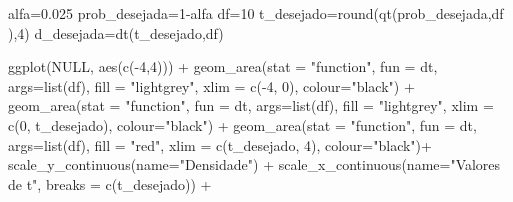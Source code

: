 \documentclass[
]{book}
\newenvironment{Shaded}{\begin{snugshade}}{\end{snugshade}}
\newcommand{\AttributeTok}[1]{\textcolor[rgb]{0.77,0.63,0.00}{#1}}
\newcommand{\ConstantTok}[1]{\textcolor[rgb]{0.00,0.00,0.00}{#1}}
\newcommand{\DecValTok}[1]{\textcolor[rgb]{0.00,0.00,0.81}{#1}}
\newcommand{\FloatTok}[1]{\textcolor[rgb]{0.00,0.00,0.81}{#1}}
\newcommand{\FunctionTok}[1]{\textcolor[rgb]{0.00,0.00,0.00}{#1}}
\newcommand{\NormalTok}[1]{#1}
\newcommand{\OtherTok}[1]{\textcolor[rgb]{0.56,0.35,0.01}{#1}}
\newcommand{\SpecialCharTok}[1]{\textcolor[rgb]{0.00,0.00,0.00}{#1}}
\newcommand{\StringTok}[1]{\textcolor[rgb]{0.31,0.60,0.02}{#1}}
\begin{document}
\hfill\break

\begin{Shaded}
\begin{Highlighting}[]
\NormalTok{alfa}\OtherTok{=}\FloatTok{0.025}
\NormalTok{prob\_desejada}\OtherTok{=}\DecValTok{1}\SpecialCharTok{{-}}\NormalTok{alfa}
\NormalTok{df}\OtherTok{=}\DecValTok{10}
\NormalTok{t\_desejado}\OtherTok{=}\FunctionTok{round}\NormalTok{(}\FunctionTok{qt}\NormalTok{(prob\_desejada,df ),}\DecValTok{4}\NormalTok{)}
\NormalTok{d\_desejada}\OtherTok{=}\FunctionTok{dt}\NormalTok{(t\_desejado,df)}


\FunctionTok{ggplot}\NormalTok{(}\ConstantTok{NULL}\NormalTok{, }\FunctionTok{aes}\NormalTok{(}\FunctionTok{c}\NormalTok{(}\SpecialCharTok{{-}}\DecValTok{4}\NormalTok{,}\DecValTok{4}\NormalTok{))) }\SpecialCharTok{+}
  \FunctionTok{geom\_area}\NormalTok{(}\AttributeTok{stat =} \StringTok{"function"}\NormalTok{, }
            \AttributeTok{fun =}\NormalTok{ dt,}
            \AttributeTok{args=}\FunctionTok{list}\NormalTok{(df), }
            \AttributeTok{fill =} \StringTok{"lightgrey"}\NormalTok{, }
            \AttributeTok{xlim =} \FunctionTok{c}\NormalTok{(}\SpecialCharTok{{-}}\DecValTok{4}\NormalTok{, }\DecValTok{0}\NormalTok{),}
            \AttributeTok{colour=}\StringTok{"black"}\NormalTok{) }\SpecialCharTok{+}
  \FunctionTok{geom\_area}\NormalTok{(}\AttributeTok{stat =} \StringTok{"function"}\NormalTok{, }
            \AttributeTok{fun =}\NormalTok{ dt, }
            \AttributeTok{args=}\FunctionTok{list}\NormalTok{(df), }
            \AttributeTok{fill =} \StringTok{"lightgrey"}\NormalTok{, }
            \AttributeTok{xlim =} \FunctionTok{c}\NormalTok{(}\DecValTok{0}\NormalTok{, t\_desejado),}
            \AttributeTok{colour=}\StringTok{"black"}\NormalTok{) }\SpecialCharTok{+}
  \FunctionTok{geom\_area}\NormalTok{(}\AttributeTok{stat =} \StringTok{"function"}\NormalTok{, }
            \AttributeTok{fun =}\NormalTok{ dt, }
            \AttributeTok{args=}\FunctionTok{list}\NormalTok{(df), }
            \AttributeTok{fill =} \StringTok{"red"}\NormalTok{, }
            \AttributeTok{xlim =} \FunctionTok{c}\NormalTok{(t\_desejado, }\DecValTok{4}\NormalTok{),}
            \AttributeTok{colour=}\StringTok{"black"}\NormalTok{)}\SpecialCharTok{+}
\FunctionTok{scale\_y\_continuous}\NormalTok{(}\AttributeTok{name=}\StringTok{"Densidade"}\NormalTok{) }\SpecialCharTok{+}
  \FunctionTok{scale\_x\_continuous}\NormalTok{(}\AttributeTok{name=}\StringTok{"Valores de t"}\NormalTok{, }\AttributeTok{breaks =} \FunctionTok{c}\NormalTok{(t\_desejado)) }\SpecialCharTok{+}

\end{Highlighting}
\end{Shaded}
\end{document}
